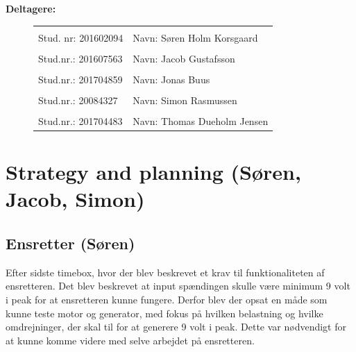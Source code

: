 \textbf{Deltagere:}
\begin{figure}[h]
  \centering
  \begin{tabular}{|p{5cm}p{10cm}|}
    \hline
    &\\
    Stud. nr: 201602094 & Navn: Søren Holm Korsgaard \\
    \hline
    &\\
    Stud.nr.: 201607563 & Navn: Jacob Gustafsson \\
    \hline
    &\\
    Stud.nr.: 201704859 & Navn: Jonas Buus \\
    \hline
    &\\
    Stud.nr.: 20084327 & Navn: Simon Rasmussen \\
    \hline
    &\\
    Stud.nr.: 201704483 & Navn: Thomas Dueholm Jensen \\
    \hline
  \end{tabular}

\end{figure}
\vspace{-5mm}
\setcounter{tocdepth}{2}
\tableofcontents
\thispagestyle{empty}
\newpage
\setcounter{page}{1}


\section{Strategy and planning (Søren, Jacob, Simon)}
\label{sec:strategy-planning}

\subsection{Ensretter (Søren)}
\label{sec:ensretter-soren}
Efter sidste timebox, hvor der blev beskrevet et krav til funktionaliteten af ensretteren. Det blev beskrevet at input spændingen skulle være minimum 9 volt i peak for at ensretteren kunne fungere. Derfor blev der opsat en måde som kunne teste motor og generator, med fokus på hvilken belastning og hvilke omdrejninger, der skal til for at generere 9 volt i peak. Dette var nødvendigt for at kunne komme videre med selve arbejdet på ensretteren. 

